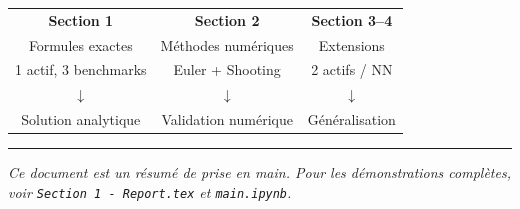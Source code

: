 \documentclass[12pt,a4paper]{article}
\begin{document}
\begin{center}
\begin{tabular}{ccc}
\textbf{Section 1} & \textbf{Section 2} & \textbf{Section 3--4} \\
Formules exactes & Méthodes numériques & Extensions \\
1 actif, 3 benchmarks & Euler + Shooting & 2 actifs / NN \\
$\downarrow$ & $\downarrow$ & $\downarrow$ \\
Solution analytique & Validation numérique & Généralisation \\
\end{tabular}
\end{center}

\vfill
\hrule
\smallskip
{\small\textit{Ce document est un résumé de prise en main. Pour les démonstrations complètes, voir \texttt{Section 1 - Report.tex} et \texttt{main.ipynb}.}}
\end{document}
